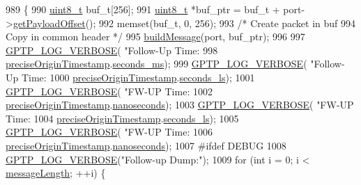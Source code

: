 \begin{DoxyCode}
989 \{
990     \hyperlink{stdint_8h_aba7bc1797add20fe3efdf37ced1182c5}{uint8\_t} buf\_t[256];
991     \hyperlink{stdint_8h_aba7bc1797add20fe3efdf37ced1182c5}{uint8\_t} *buf\_ptr = buf\_t + port->\hyperlink{class_common_port_a2697fd0fc7139659877b76cd1b022d44}{getPayloadOffset}();
992     memset(buf\_t, 0, 256);
993     \textcolor{comment}{/* Create packet in buf}
994 \textcolor{comment}{       Copy in common header */}
995     \hyperlink{class_p_t_p_message_follow_up_a70eeb75d3cca051e5581f430b88192a8}{buildMessage}(port, buf\_ptr);
996 
997     \hyperlink{gptp__log_8hpp_add03384a2a8099b27e07d041cce77e6f}{GPTP\_LOG\_VERBOSE}( \textcolor{stringliteral}{"Follow-Up Time: %
998               \hyperlink{class_p_t_p_message_follow_up_ab410646215c0bcbaf124d5923f22e2ca}{preciseOriginTimestamp}.\hyperlink{class_timestamp_a5d98378d782519e6f9c17db70f1620f0}{seconds\_ms});
999     \hyperlink{gptp__log_8hpp_add03384a2a8099b27e07d041cce77e6f}{GPTP\_LOG\_VERBOSE}( \textcolor{stringliteral}{"Follow-Up Time: %
1000          \hyperlink{class_p_t_p_message_follow_up_ab410646215c0bcbaf124d5923f22e2ca}{preciseOriginTimestamp}.\hyperlink{class_timestamp_a2bf200e58cd268d8b86cf93c51500a44}{seconds\_ls});
1001     \hyperlink{gptp__log_8hpp_add03384a2a8099b27e07d041cce77e6f}{GPTP\_LOG\_VERBOSE}( \textcolor{stringliteral}{"FW-UP Time: %
1002               \hyperlink{class_p_t_p_message_follow_up_ab410646215c0bcbaf124d5923f22e2ca}{preciseOriginTimestamp}.\hyperlink{class_timestamp_a78ae11d98fcfe738239d0a853d82c84a}{nanoseconds});
1003     \hyperlink{gptp__log_8hpp_add03384a2a8099b27e07d041cce77e6f}{GPTP\_LOG\_VERBOSE}( \textcolor{stringliteral}{"FW-UP Time: %
1004               \hyperlink{class_p_t_p_message_follow_up_ab410646215c0bcbaf124d5923f22e2ca}{preciseOriginTimestamp}.\hyperlink{class_timestamp_a2bf200e58cd268d8b86cf93c51500a44}{seconds\_ls});
1005     \hyperlink{gptp__log_8hpp_add03384a2a8099b27e07d041cce77e6f}{GPTP\_LOG\_VERBOSE}( \textcolor{stringliteral}{"FW-UP Time: %
1006               \hyperlink{class_p_t_p_message_follow_up_ab410646215c0bcbaf124d5923f22e2ca}{preciseOriginTimestamp}.\hyperlink{class_timestamp_a78ae11d98fcfe738239d0a853d82c84a}{nanoseconds});
1007 \textcolor{preprocessor}{#ifdef DEBUG}
1008     \hyperlink{gptp__log_8hpp_add03384a2a8099b27e07d041cce77e6f}{GPTP\_LOG\_VERBOSE}(\textcolor{stringliteral}{"Follow-up Dump:"});
1009     \textcolor{keywordflow}{for} (\textcolor{keywordtype}{int} i = 0; i < \hyperlink{class_p_t_p_message_common_a6c490faee54bca860c4d897aae50990f}{messageLength}; ++i) \{
}}}}}
\end{DoxyCode}
